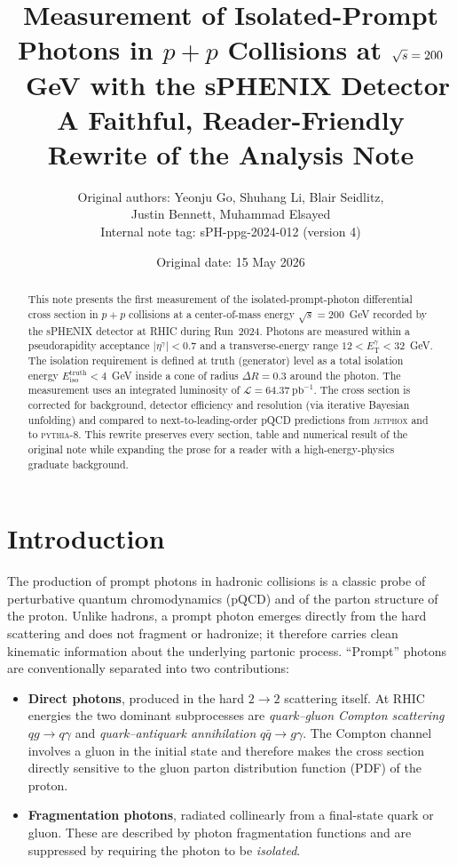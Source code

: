 \documentclass[11pt]{article}
\title{\textbf{Measurement of Isolated-Prompt Photons in $p+p$ Collisions
at $\sqrts = 200$~GeV with the sPHENIX Detector}\\[4pt]
\large A Faithful, Reader-Friendly Rewrite of the Analysis Note}
\author{Original authors: Yeonju Go, Shuhang Li, Blair Seidlitz,\\
Justin Bennett, Muhammad Elsayed\\[4pt]
\small Internal note tag: sPH-ppg-2024-012 (version 4)}
\date{Original date: 15 May 2026}
\newcommand{\ETg}{E_{\mathrm{T}}^{\gamma}}
\newcommand{\Eiso}{E_{\mathrm{iso}}}
\newcommand{\sqrts}{\sqrt{s}}
\newcommand{\dr}{\Delta R}
\begin{document}
\maketitle

\begin{abstract}
\noindent
This note presents the first measurement of the isolated-prompt-photon
differential cross section in $p+p$ collisions at a center-of-mass energy
$\sqrts = 200$~GeV recorded by the sPHENIX detector at RHIC during Run~2024.
Photons are measured within a pseudorapidity acceptance $|\eta^{\gamma}| < 0.7$
and a transverse-energy range $12 < \ETg < 32$~GeV. The isolation requirement
is defined at truth (generator) level as a total isolation energy
$\Eiso^{\mathrm{truth}} < 4$~GeV inside a cone of radius $\dr = 0.3$ around the
photon. The measurement uses an integrated luminosity of
$\mathcal{L} = 64.37~\mathrm{pb}^{-1}$. The cross section is corrected for
background, detector efficiency and resolution (via iterative Bayesian
unfolding) and compared to next-to-leading-order pQCD predictions from
\textsc{jetphox} and to \textsc{pythia-8}. This rewrite preserves every section,
table and numerical result of the original note while expanding the prose for a
reader with a high-energy-physics graduate background.
\end{abstract}

\tableofcontents
\newpage

\section{Introduction}

The production of prompt photons in hadronic collisions is a classic probe of
perturbative quantum chromodynamics (pQCD) and of the parton structure of the
proton. Unlike hadrons, a prompt photon emerges directly from the hard
scattering and does not fragment or hadronize; it therefore carries clean
kinematic information about the underlying partonic process. ``Prompt''
photons are conventionally separated into two contributions:

\begin{itemize}
  \item \textbf{Direct photons}, produced in the hard $2\to2$ scattering
        itself. At RHIC energies the two dominant subprocesses are
        \emph{quark--gluon Compton scattering} $q g \to q \gamma$ and
        \emph{quark--antiquark annihilation} $q\bar q \to g\gamma$. The Compton
        channel involves a gluon in the initial state and therefore makes the
        cross section directly sensitive to the gluon parton distribution
        function (PDF) of the proton.
  \item \textbf{Fragmentation photons}, radiated collinearly from a final-state
        quark or gluon. These are described by photon fragmentation functions
        and are suppressed by requiring the photon to be \emph{isolated}.
\end{itemize}
\end{document}
